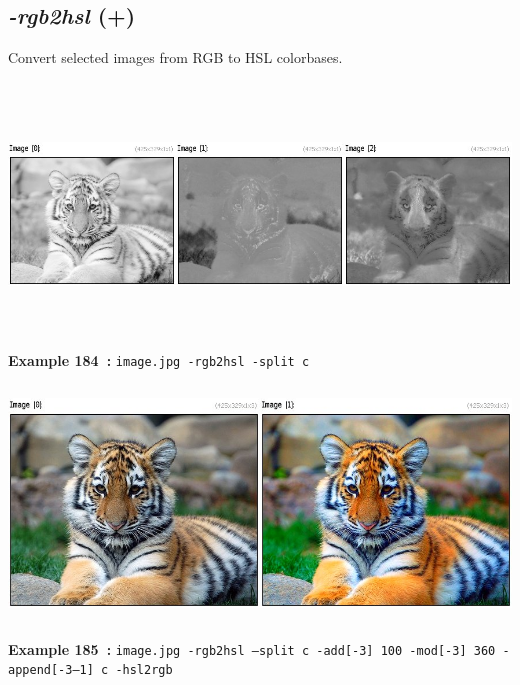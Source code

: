 \documentclass[a4paper,11pt,twoside]{book}
\begin{document}
\subsection{\emph{-rgb2hsl} (+)}\vspace*{-0.5em}
Convert selected images from RGB to HSL colorbases.
\begin{center}\includegraphics[keepaspectratio=true,height=7cm,width=\textwidth]{img/gmic_def184.jpg}\\
{\footnotesize \textbf{Example 184~:} \texttt{image.jpg -rgb2hsl -split c}}
\\\includegraphics[keepaspectratio=true,height=7cm,width=\textwidth]{img/gmic_def185.jpg}\\
{\footnotesize \textbf{Example 185~:} \texttt{image.jpg -rgb2hsl --split c -add[-3] 100 -mod[-3] 360 -append[-3--1] c -hsl2rgb}}
\end{center}
\end{document}

